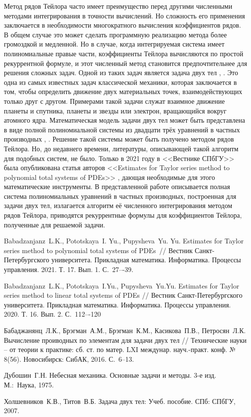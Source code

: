 Метод рядов Тейлора часто имеет преимущество перед другими численными методами интегрирования в точности вычислений. Но сложность его применения заключается в необходимости многократного вычисления коэффициентов рядов. В общем случае это может сделать программную реализацию метода более громоздкой и медленной. Но в случае, когда интегрируемая система имеет полиномиальные правые части, коэффициенты Тейлора вычисляются по простой рекуррентной формуле, и этот численный метод становится предпочтительнее для решения сложных задач.
Одной из таких задач является задача двух тел \cite{1975}, \cite{2007}.  Это одна из самых известных задач классической механики, которая заключается в том, чтобы определить движение двух материальных точек, взаимодействующих только друг с другом. Примерами такой задачи служат взаимное движение планеты и спутника, планеты и звезды или электрон, вращающийся вокруг атомного ядра. Математическая модель задачи двух тел может быть представлена в виде полной полиномиальной системы  из двадцати трёх уравнений в частных производных \cite{2016}, \cite{2020}. Решение такой системы может быть получено методом рядов Тейлора. Но, до недавнего времени, литературы, описывающей такой алгоритм для подобных систем, не было. Только в 2021 году в <<Вестнике СПбГУ>> была опубликована статья авторов <<Estimates for Taylor series method to polynomial total systems of PDEs>> \cite{2021}, дающая необходимые для этого математические инструменты.
В представленной работе описывается полная система полиномиальных уравнений в частных производных, построенная для задачи двух тел, излагается алгоритм её численного интегрирования методом рядов Тейлора, приводятся рекуррентные формулы для коэффициентов Тейлора, полученные для решаемой задачи.



\begin{thebibliography}{9} %



 Babadzanjanz~L.K., Pototskaya~I. Yu., Pupysheva~Yu. Yu. Estimates for
Taylor series method to polynomial total systems of PDEs~// Вестник Санкт-Петербургского
университета. Прикладная математика. Информатика. Процессы управления. 2021. Т. 17.
Вып. 1. С.~27–-39.

 Babadzanjanz~L.K., Pototskaya~I.Yu., Pupysheva~Yu.Yu. Estimates
for Taylor series method to linear total systems of PDEs // Вестник Санкт-Петербургского
университета. Прикладная математика. Информатика. Процессы управления. 2020. Т. 16.
Вып. 2. С.~112–-120

 Бабаджанянц~Л.К., Брэгман~А.М., Брэгман~К.М., Касикова~П.В., Петросян~Л.К. Вычисление проиводных по элементам для задачи двух тел // Технические науки -- от теории к практике: сб. ст. по матер. LXI междунар. науч.-практ. конф. № 8(56). Новосибирск: СибАК, 2016. С.~6--13.
    
 Дубошин~Г.Н. Небесная механика. Основные задачи и методы. 3-е изд. М.:~Наука, 1975.

 Холшевников~К.В., Титов~В.Б. Задача двух тел: Учеб. пособие. СПб: СПбГУ, 2007.


\end{thebibliography}





% 
